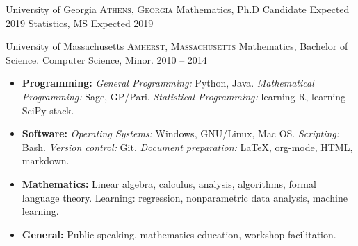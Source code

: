 \documentclass[10pt,a4paper]{article}
\begin{document}

\headedsection
  {University of Georgia}
  {\textsc{Athens, Georgia}} {%
  \headedsubsection
    {Mathematics, Ph.D Candidate}
    {Expected 2019}
    {}
    \headedsubsection
    {Statistics, MS}
    {Expected 2019}
    {}
}

\headedsection
  {University of Massachusetts}
  {\textsc{Amherst, Massachusetts}} {%
  \headedsubsection
    {Mathematics, Bachelor of Science. Computer Science, Minor.}
    {2010 -- 2014}
    {}
}

\spacedhrule{0.5em}{-0.4em}


\begin{itemize}
  \item \textbf{Programming:} \textit{General Programming:} Python, Java. \textit{Mathematical Programming:} Sage, GP/Pari. \textit{Statistical Programming:} learning R, learning SciPy stack.
  \item \textbf{Software:} \textit{Operating Systems:} Windows, GNU/Linux, Mac OS. \textit{Scripting:} Bash. \textit{Version control:} Git. \textit{Document preparation:} \LaTeX, org-mode, HTML, markdown.
   \item \textbf{Mathematics:} Linear algebra, calculus, analysis, algorithms, formal language theory. Learning: regression, nonparametric data analysis, machine learning.
   \item \textbf{General:} Public speaking, mathematics education, workshop facilitation.
\end{itemize}


\spacedhrule{0.5em}{-0.4em}
\end{document}
